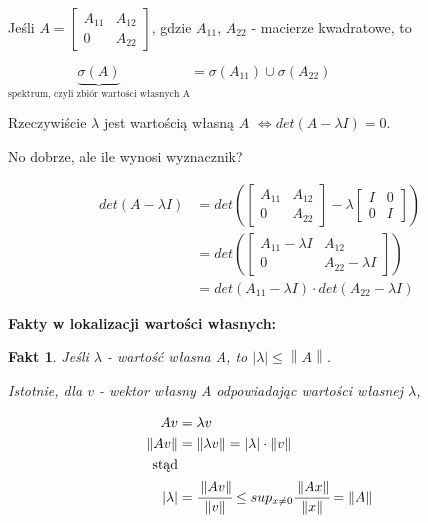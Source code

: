 \documentclass[hidelinks,a4paper,fleqn]{article}
\newcommand{\norm}[1]{\left\lVert#1\right\rVert}
\newtheorem{fakt}{Fakt}
\begin{document}
Jeśli $A = \left[\begin{array}{c|c}A_{11} & A_{12} \\ \hline 0 & A_{22}\end{array}\right]$, gdzie $A_{11}$, $A_{22}$ - macierze kwadratowe, to

$\underbrace{\sigma(A)}_{\textrm{spektrum, czyli zbiór wartości własnych A}} = \sigma(A_{11}) \cup \sigma(A_{22})$

Rzeczywiście $\lambda$ jest wartością własną $A$ $\iff det(A -\lambda I) = 0$.

No dobrze, ale ile wynosi wyznacznik?

\begin{equation}
	\begin{aligned}
		det(A - \lambda I) & = det\left( \left[\begin{array}{c|c}A_{11} & A_{12} \\ \hline 0 & A_{22}\end{array}\right] - \lambda  \left[\begin{array}{c|c}I & 0 \\ \hline 0 & I\end{array}\right] \right) \\
		& = det\left( \left[\begin{array}{c|c}A_{11}-\lambda I & A_{12} \\ \hline 0 & A_{22} - \lambda I\end{array}\right]\right) \\
		& = det(A_{11} - \lambda I) \cdot det(A_{22} - \lambda I)
	\end{aligned}
\end{equation}

\textbf{Fakty w lokalizacji wartości własnych:}

\begin{fakt}
	Jeśli $\lambda$ - wartość własna A, to $|\lambda| \leq \norm{A}$.
		
	Istotnie, dla $v$ - wektor własny A odpowiadając wartości własnej $\lambda$,
		
	\begin{equation}
		\begin{aligned}
			Av             & =\lambda v                                                                                   \\
			\norm{A v}    & = \norm{\lambda v} = |\lambda| \cdot \norm{v}                                              \\
			\textrm{stąd} &                                                                                              \\
			|\lambda|      & = \cfrac{\norm{A v}}{\norm{v}} \leq sup_{x \neq 0} \cfrac{\norm{Ax}}{\norm{x}} = \norm{A} 
		\end{aligned}
	\end{equation}
		
\end{fakt}
\end{document}
